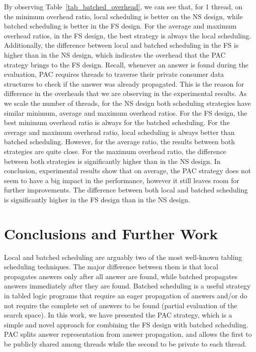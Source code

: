 \documentclass{llncs}
\begin{document}
By observing Table~\ref{tab_batched_overhead}, we can see that, for 1
thread, on the minimum overhead ratio, local scheduling is better on
the NS design, while batched scheduling is better in the FS
design. For the average and maximum overhead ratios, in the FS design,
the best strategy is always the local scheduling. Additionally, the
difference between local and batched scheduling in the FS is higher
than in the NS design, which indicates the overhead that the PAC
strategy brings to the FS design. Recall, whenever an answer is found
during the evaluation, PAC requires threads to traverse their private
consumer data structures to check if the answer was already
propagated. This is the reason for difference in the overheads that we
are observing in the experimental results. As we scale the number of
threads, for the NS design both scheduling strategies have similar
minimum, average and maximum overhead ratios. For the FS design, the
best minimum overhead ratio is always for the batched scheduling. For
the average and maximum overhead ratio, local scheduling is always
better than batched scheduling. However, for the average ratio, the
results between both strategies are quite close. For the maximum
overhead ratio, the difference between both strategies is
significantly higher than in the NS design. In conclusion,
experimental results show that on average, the PAC strategy does not
seem to have a big impact in the performance, however it still leaves
room for further improvements. The difference between both local and
batched scheduling is significantly higher in the FS design than in
the NS design.


\section{Conclusions and Further Work}

Local and batched scheduling are arguably two of the most well-known
tabling scheduling techniques. The major difference between them is
that local propagates answers only after all answer are found, while
batched propagates answers immediately after they are found. Batched
scheduling is a useful strategy in tabled logic programs that require
an eager propagation of answers and/or do not require the complete set
of answers to be found (partial evaluation of the search space). In
this work, we have presented the PAC strategy, which is a simple and
novel approach for combining the FS design with batched
scheduling. PAC splits answer representation from answer propagation,
and allows the first to be publicly shared among threads while the
second to be private to each thread.
\end{document}
